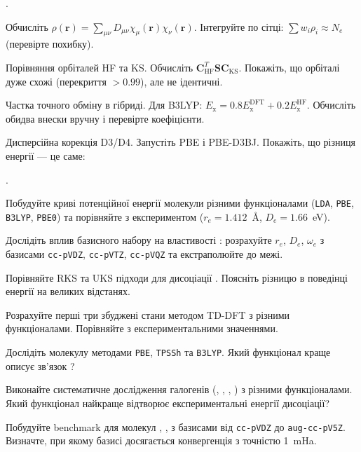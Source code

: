 \begin{tasks}
.

Обчисліть $\rho(\mathbf{r}) = \sum_{\mu\nu} D_{\mu\nu} \chi_\mu(\mathbf{r}) \chi_\nu(\mathbf{r})$.
Інтегруйте по сітці: $\sum w_i \rho_i \approx N_e$ (перевірте похибку).

\item Порівняння орбіталей HF та KS.
Обчисліть $\mathbf{C}_{\text{HF}}^T \mathbf{S} \mathbf{C}_{\text{KS}}$.
Покажіть, що орбіталі дуже схожі (перекриття $> 0.99$), але не ідентичні.

\item Частка точного обміну в гібриді.
Для B3LYP: $E_{\text{x}} = 0.8 E_{\text{x}}^{\text{DFT}} + 0.2 E_{\text{x}}^{\text{HF}}$.
Обчисліть обидва внески вручну і перевірте коефіцієнти.

\item Дисперсійна корекція D3/D4.
Запустіть PBE і PBE-D3BJ.
Покажіть, що різниця енергії --- це саме:

.

\item Побудуйте криві потенційної енергії молекули  різними функціоналами (\texttt{LDA}, \texttt{PBE}, \texttt{B3LYP}, \texttt{PBE0}) та порівняйте з експериментом ($r_e = 1.412$~\AA, $D_e = 1.66$~eV).

\item Дослідіть вплив базисного набору на властивості : розрахуйте $r_e$, $D_e$, $\omega_e$ з базисами \texttt{cc-pVDZ}, \texttt{cc-pVTZ}, \texttt{cc-pVQZ} та екстраполюйте до межі.

\item Порівняйте RKS та UKS підходи для дисоціації . Поясніть різницю в поведінці енергії на великих відстанях.

\item Розрахуйте перші три збуджені стани  методом TD-DFT з різними функціоналами. Порівняйте з експериментальними значеннями.

\item Дослідіть молекулу  методами \texttt{PBE}, \texttt{TPSSh} та \texttt{B3LYP}. Який функціонал краще описує зв'язок ?

\item Виконайте систематичне дослідження галогенів (, , , ) з різними функціоналами. Який функціонал найкраще відтворює експериментальні енергії дисоціації?

\item Побудуйте benchmark для молекул , ,  з базисами від \texttt{cc-pVDZ} до \texttt{aug-cc-pV5Z}. Визначте, при якому базисі досягається конвергенція з точністю 1~mHa.


\end{tasks}

